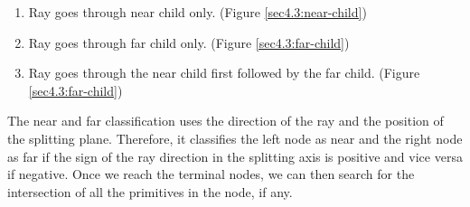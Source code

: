 \documentclass[a4paper,11pt,oneside]{article}
\begin{document}
\begin{enumerate}
	\item Ray goes through near child only. (Figure \ref{sec4.3:near-child})
	\item Ray goes through far child only. (Figure \ref{sec4.3:far-child})
	\item Ray goes through the near child first followed by the far child. (Figure \ref{sec4.3:far-child})
\end{enumerate}

The near and far classification uses the direction of the ray and the position of the splitting plane. Therefore, it classifies the left node as near and the right node as far if the sign of the ray direction in the splitting axis is positive and vice versa if negative. Once we reach the terminal nodes, we can then search for the intersection of all the primitives in the node, if any.
\end{document}
